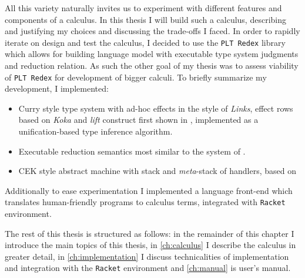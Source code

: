 \documentclass[inz, english, shortabstract]{iithesis}
\newcommand{\Redex}{\texttt{PLT Redex}}
\newcommand{\Racket}{\texttt{Racket}}
\begin{document}
All this variety naturally invites us to experiment with different features and components of a calculus.
In this thesis I will build such a calculus, describing and justifying my choices and discussing the trade-offs I faced.
In order to rapidly iterate on design and test the calculus, I decided to use the \Redex{} library which allows for building language model with executable type system judgments and reduction relation.
As such the other goal of my thesis was to assess viability of \Redex{} for development of bigger calculi.
To briefly summarize my development, I implemented: 
\begin{itemize}
  \item Curry style type system with ad-hoc effects in the style of \emph{Links}, effect rows based on \emph{Koka} and \emph{lift} construct first shown in \cite{Biernacki2017}, implemented as a unification-based type inference algorithm.
  \item Executable reduction semantics most similar to the system of \cite{Biernacki2017}.
  \item CEK style abstract machine with stack and \emph{meta}-stack of handlers, based on \cite{Hillerstrom2016}
\end{itemize}
Additionally to ease experimentation I implemented a language front-end which translates human-friendly programs to calculus terms, integrated with \Racket{} environment.

The rest of this thesis is structured as follows: in the remainder of this chapter I introduce the main topics of this thesis, in \autoref{ch:calculus} I describe the calculus in greater detail, in \autoref{ch:implementation} I discuss technicalities of implementation and integration with the \Racket{} environment and \autoref{ch:manual} is user's manual.
\end{document}
